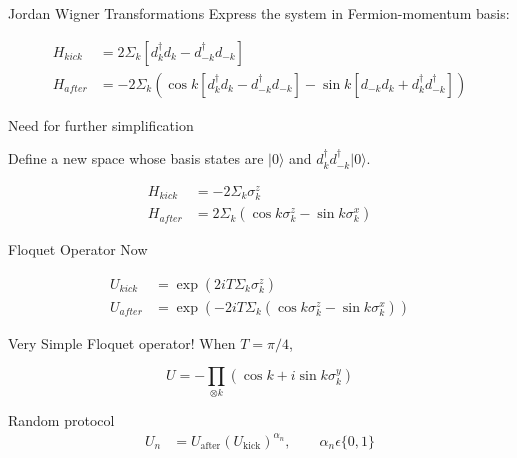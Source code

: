 \documentclass[11pt]{beamer}
\begin{document}
\begin{frame}{Jordan Wigner Transformations}
Express the system in Fermion-momentum basis:

\begin{align}
H_{kick} &= 2 \Sigma_{k}  [d_{k}^\dagger d_{k} - d_{-k}^\dagger d_{-k}]\\
H_{after} &= -2\Sigma_{k}(  \cos k [d_{k}^\dagger d_{k} - d_{-k}^\dagger d_{-k}] -  \sin k [d_{-k}d_{k} + d_{k}^\dagger d_{-k}^\dagger])
\end{align}		

\end{frame}

\begin{frame}{Need for further simplification}

Define a new space whose basis states are $ |0\rangle $  and $ d_{k}^\dagger d_{-k}^\dagger |0\rangle $.

\begin{align}
H_{kick} &= -2 \Sigma_{k}  \sigma_{k}^z\\
H_{after} &= 2\Sigma_{k} (\cos k \sigma_{k}^z - \sin k \sigma_{k}^x )
\end{align}	
\end{frame}

\begin{frame}{Floquet Operator Now}

	\begin{align}
U_{kick}& = \exp(2 i T  \Sigma_{k}  \sigma_{k}^z)\\
U_{after} & = \exp(-2iT \Sigma_{k} (\cos k \sigma_{k}^z - \sin k \sigma_{k}^x))
\end{align}

\end{frame}

\begin{frame}{Very Simple Floquet operator!}
When $ T = \pi/4 $,

	\begin{equation}\label{key}
U = - \prod_{\otimes k} (\cos k + i \sin k \sigma_{k}^y)
\end{equation}

\end{frame}

\begin{frame}{Random protocol\cite{PhysRevB.98.064305}}
\begin{align*}
U_{n} & = U_{\text{after}}(U_{\text{kick}})^{\alpha_n} , \qquad  \alpha_n \epsilon \{0,1\}\\
\end{align*}
\end{frame}
\end{document}

